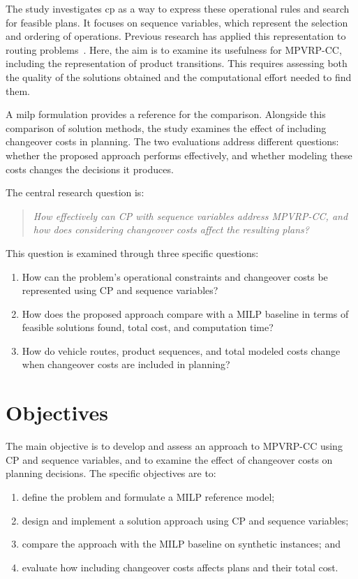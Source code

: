 The study investigates \gls{cp} as a way to express these operational rules
and search for feasible plans. It focuses on sequence variables, which
represent the selection and ordering of operations. Previous research has
applied this representation to routing problems~\cite{delecluse2022sequence}.
Here, the aim is to examine its usefulness for MPVRP-CC, including the
representation of product transitions. This requires assessing both the
quality of the solutions obtained and the computational effort needed to
find them.

A \gls{milp} formulation provides a reference for the comparison. Alongside
this comparison of solution methods, the study examines the effect of
including changeover costs in planning. The two evaluations address different
questions: whether the proposed approach performs effectively, and whether
modeling these costs changes the decisions it produces.

The central research question is:
\begin{quote}
\emph{How effectively can CP with sequence variables address MPVRP-CC, and
how does considering changeover costs affect the resulting plans?}
\end{quote}
This question is examined through three specific questions:
\begin{enumerate}
  \item How can the problem's operational constraints and changeover costs
        be represented using CP and sequence variables?
  \item How does the proposed approach compare with a MILP baseline
        in terms of feasible solutions found, total cost, and computation time?
  \item How do vehicle routes, product sequences, and total modeled costs
        change when changeover costs are included in planning?
\end{enumerate}

\section*{Objectives}

The main objective is to develop and assess an approach to MPVRP-CC using CP
and sequence variables, and to examine the effect of changeover costs on
planning decisions. The specific objectives are to:
\begin{enumerate}
  \item define the problem and formulate a MILP reference model;
  \item design and implement a solution approach using CP and sequence variables;
  \item compare the approach with the MILP baseline on synthetic instances; and
  \item evaluate how including changeover costs affects plans and their total cost.
\end{enumerate}

